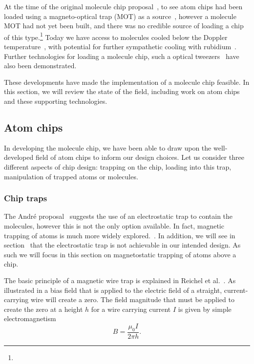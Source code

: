At the time of the original molecule chip proposal~\cite{Andre2006}, to see atom
chips had been loaded using a magneto-optical trap (MOT) as a
source~\cite{Reichel1999, Ott2001}, however a molecule MOT had not yet been
built, and there was no credible source of loading a chip of this
type.\footnote{}
%
Today we have access to molecules cooled below the Doppler
temperature~\cite{Truppe2017}, with potential for further sympathetic cooling
with rubidium~. Further technologies for loading a
molecule chip, such a optical tweezers~\cite{Liueaar7797} have also been
demonstrated.

These developments have made the implementation of a molecule chip feasible. In
this section, we will review the state of the field, including work on atom
chips and these supporting technologies.

\subsection{Atom chips}


In developing the molecule chip, we have been able to draw upon the
well-developed field of atom chips to inform our design choices. Let us consider
three different aspects of chip design: trapping on the chip, loading into this
trap, manipulation of trapped atoms or molecules.

\subsubsection{Chip traps}

The Andr\'e proposal~\cite{Andre2006} suggests the use of an electrostatic trap
to contain the molecules, however this is not the only option available. In
fact, magnetic trapping of atoms is much more widely explored.~\cite{2011Ac}.
 In addition, we will see in section~%
that the electrostatic trap is not achievable in our intended design. As such we
will focus in this section on magnetostatic trapping of atoms above a chip.

The basic principle of a magnetic wire trap is explained in Reichel et
al.~\cite{Reichel1999}. As illustrated in  a
bias field that is applied to the electric field of a straight, current-carrying
wire will create a zero. The field magnitude that must be applied to create the
zero at a height $h$ for a wire carrying current $I$ is given by simple
electromagnetism~\cite{Jackson1975}
%
\begin{equation}
  B = \frac{\mu_0 I}{2\pi h}.
  \label{litrev:eqn:bias}
\end{equation}

